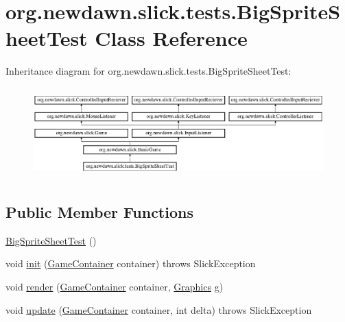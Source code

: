 \hypertarget{classorg_1_1newdawn_1_1slick_1_1tests_1_1_big_sprite_sheet_test}{}\section{org.\+newdawn.\+slick.\+tests.\+Big\+Sprite\+Sheet\+Test Class Reference}
\label{classorg_1_1newdawn_1_1slick_1_1tests_1_1_big_sprite_sheet_test}
Inheritance diagram for org.\+newdawn.\+slick.\+tests.\+Big\+Sprite\+Sheet\+Test\+:\begin{figure}[H]
\begin{center}
\leavevmode
\includegraphics[height=3.522012cm]{classorg_1_1newdawn_1_1slick_1_1tests_1_1_big_sprite_sheet_test}
\end{center}
\end{figure}
\subsection*{Public Member Functions}
\begin{DoxyCompactItemize}
\item 
\mbox{\hyperlink{classorg_1_1newdawn_1_1slick_1_1tests_1_1_big_sprite_sheet_test_a28504a9e1d9794c3ba13049975bc25a6}{Big\+Sprite\+Sheet\+Test}} ()
\item 
void \mbox{\hyperlink{classorg_1_1newdawn_1_1slick_1_1tests_1_1_big_sprite_sheet_test_aef0faf2ee6a42c1639e3a40918d726da}{init}} (\mbox{\hyperlink{classorg_1_1newdawn_1_1slick_1_1_game_container}{Game\+Container}} container)  throws Slick\+Exception 
\item 
void \mbox{\hyperlink{classorg_1_1newdawn_1_1slick_1_1tests_1_1_big_sprite_sheet_test_ab334c6875c2b46d071c9013d67a8917f}{render}} (\mbox{\hyperlink{classorg_1_1newdawn_1_1slick_1_1_game_container}{Game\+Container}} container, \mbox{\hyperlink{classorg_1_1newdawn_1_1slick_1_1_graphics}{Graphics}} g)
\item 
void \mbox{\hyperlink{classorg_1_1newdawn_1_1slick_1_1tests_1_1_big_sprite_sheet_test_aee2a5645178506309fef13a0d832d86f}{update}} (\mbox{\hyperlink{classorg_1_1newdawn_1_1slick_1_1_game_container}{Game\+Container}} container, int delta)  throws Slick\+Exception 
\end{DoxyCompactItemize}
